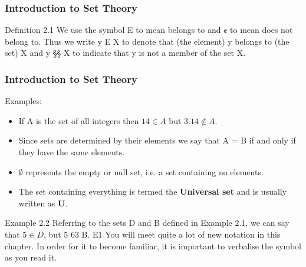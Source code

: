 %
%


\smallskip  %
\frametitle{Introduction to Set Theory}
\Large
Deﬁnition 2.1 
We use the symbol E to mean belongs to and ¢ to mean does not belong to.
Thus we write y E X to denote that (the element) y belongs to (the set) X and y §§ X to indicate
that y is not a member of the set X.
\smallskip  %
\frametitle{Introduction to Set Theory}
\Large
Examples:

\begin{itemize}
\item If A is the set of all integers then $14 \in A$ but $3.14 \notin A.$
\item Since sets are determined by their elements we say that A = B if and only
if they have the same elements.

\item $\emptyset$ represents the empty or null set, i.e. a set containing no elements.
\item The set containing everything is termed the \textbf{Universal set} and is usually
written as \textbf{U}.
\end{itemize}
\smallskip 
\smallskip 


Example 2.2 Referring to the sets D and B deﬁned in Example 2.1, we can say that $5 \in D$, but
5 63 B. E1
You will meet quite a lot of new notation in this chapter. In order for it to become familiar, it is
important to verbalise the symbol as you read it. 

